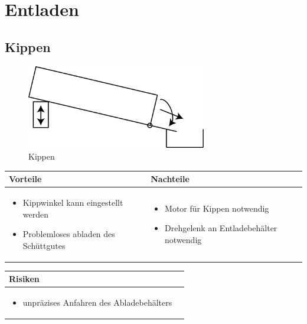 
\section{Entladen}


\subsection{Kippen}
\begin{figure} [hbp]
	\centering
	\includegraphics[width=0.7\textwidth]{fig/Entladen_Kippen.png}
	\caption{Kippen}
\end{figure}

\begin{table}[h]
\begin{tabular}{p{} | p{}}


 \textbf{Vorteile} & \textbf{Nachteile} \\ \hline
	 
\begin{itemize}
\item Kippwinkel kann eingestellt werden
\item Problemloses abladen des Schüttgutes
\end{itemize}

 
 &
 
\begin{itemize}
\item Motor für Kippen notwendig
\item Drehgelenk an Entladebehälter notwendig
\end{itemize}

\end{tabular}
\end{table}

\begin{table}[h]
\begin{tabular}{p{}p{}}


 \textbf{Risiken} & \\ \hline
	 
\begin{itemize}
\item unpräzises Anfahren des Abladebehälters
\end{itemize}

 
\end{tabular}
\end{table}

